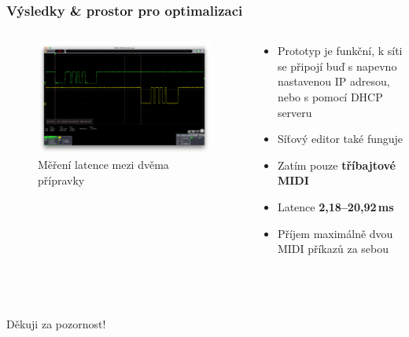 \documentclass[%
  12pt,       				%
	t,                  %
	aspectratio=1610,   %
	unicode,						%
]{beamer}				    	%
\begin{document}
\begin{frame}
	\frametitle{Výsledky \& prostor pro optimalizaci}
	\begin{columns}[T]
		\begin{column}{.6\textwidth}
			\begin{figure}
				\includegraphics[width=\linewidth]{obrazky/Mereni_1kanal.png}
				\caption{Měření latence mezi dvěma přípravky}
			\end{figure}
		\end{column}
		\begin{column}{.4\textwidth}
			\begin{itemize}
				\item Prototyp je funkční, k síti se připojí buď s napevno nastavenou IP adresou, nebo s pomocí DHCP serveru
				\item Síťový editor také funguje
				\item Zatím pouze \textbf{tříbajtové MIDI}
				\item Latence \textbf{2,18--20,92\,ms}
				\item Příjem maximálně dvou MIDI příkazů za sebou
			\end{itemize}
		\end{column}
	\end{columns}
	
\end{frame}









\begin{frame}[c] 
	\frametitle{\mbox{ }}
	\begin{center}
		{\Huge Děkuji za pozornost!}
	\end{center}
\end{frame}

\end{document}
